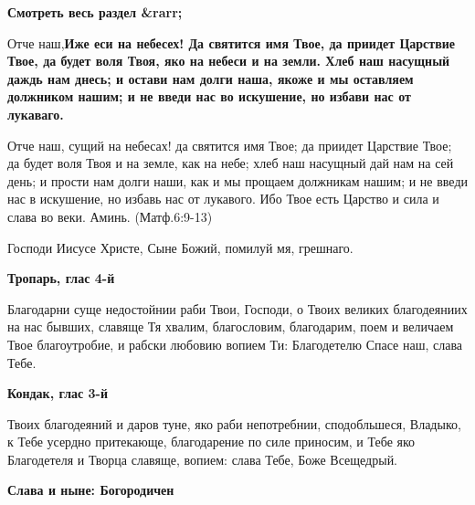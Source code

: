 


\bfseries Смотреть весь раздел &rarr;\normalfont{} 

 

Отче наш,\bfseries  \normalfont{}Иже еси на небесех! Да святится имя Твое, да приидет Царствие Твое, да будет воля Твоя, яко на небеси и на земли. Хлеб наш насущный даждь нам днесь; и остави нам долги наша, якоже и мы оставляем должником нашим; и не введи нас во искушение, но избави нас от лукаваго.


Отче наш, сущий на небесах! да святится имя Твое; да приидет Царствие Твое; да будет воля Твоя и на земле, как на небе; хлеб наш насущный дай нам на сей день; и прости нам долги наши, как и мы прощаем должникам нашим; и не введи нас в искушение, но избавь нас от лукавого. Ибо Твое есть Царство и сила и слава во веки. Аминь. (Матф.6:9-13)

\mychapterending

 

Господи Иисусе Христе, Сыне Божий, помилуй мя, грешнаго. 


\mychapterending

 

\bfseries Тропарь, глас 4-й\normalfont{}


Благодарни суще недостойнии раби Твои, Господи, о Твоих великих благодеяниих на нас бывших, славяще Тя хвалим, благословим, благодарим, поем и величаем Твое благоутробие, и рабски любовию вопием Ти: Благодетелю Спасе наш, слава Тебе.




\medskip


\bfseries Кондак, глас 3-й\normalfont{}


Твоих благодеяний и даров туне, яко раби непотребнии, сподобльшеся, Владыко, к Тебе усердно притекающе, благодарение по силе приносим, и Тебе яко Благодетеля и Творца славяще, вопием: слава Тебе, Боже Всещедрый.


\medskip


\bfseries Слава и ныне: Богородичен\normalfont{}


